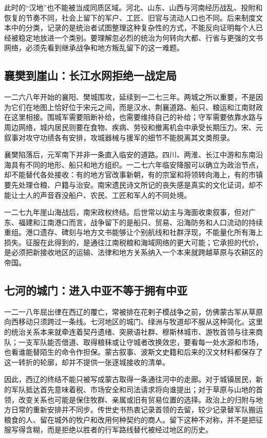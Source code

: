 此时的“汉地”也不能被当成同质区域。河北、山东、山西与河南经历战乱、投附和恢复的节奏不同，社会上留下的军户、工匠、旧官与流动人口也不同。后来制度文本中的分类，记录的是统治者试图整理这种复杂性的方式，不能反向证明每个人已经被稳定地放进一个类别。要理解忽必烈的统治为何转向大都、行省与更强的文书网络，必须先看到继承战争和地方叛乱留下的这一难题。

\subsection{襄樊到崖山：长江水网拒绝一战定局}

一二六八年开始的襄阳、樊城围攻，延续到一二七三年。两城之所以重要，不是因为它们在地图上恰好位于宋元之间，而是汉水、荆襄道路、船只、粮运和江南财政在这里相接。围城军需要阻断补给，也需要维持自己的补给；守军需要依靠水路与周边网络，城内居民则要在食物、疾病、劳役和撤离机会中承受长期压力。宋、元叙事对攻守功绩各有安排，攻城器械与援军的细节不能脱离其文类照录。

襄樊陷落后，元军南下并非一条直入临安的道路。四川、两淮、长江中游和东南沿海具有不同的地形、船只和地方组织。一二七六年临安降服可以确立为政治节点，却不能替代各处接收：有的地方官改事新朝，有的宗室和将领转向海上，有的市镇要先处理仓粮、户籍与治安。南宋遗民诗文所记的丧失感是真实的文化证词，却不能让士人的声音吞没船户、农民、工匠和军人的不同处境。

一二七九年崖山海战后，南宋政权终结。后世常以幼主与海面收束叙事，但对广东、福建和江南港口而言，战争留下的是船只、贸易、沿海防务和人口流动的持续重组。港口遗存、碑刻与地方文书能够让个别航线和社群浮现，不能量化所有海上损失。征服在此得到的，是通往江南税粮和海域网络的更大可能；它承担的代价，是必须把新接收地区的运输、法律和地方关系纳入一个本来就跨越草原与农耕区的帝国。

\subsection{七河的城门：进入中亚不等于拥有中亚}

一二一八年屈出律在西辽的覆亡，常被排在花剌子模战争之前，仿佛蒙古军从草原向西移动只须跨过一条线。七河地区的城门、绿洲与牧道却不服从这种简化。这里的统治关系本来就牵连着契丹遗绪、突厥语社群、穆斯林城市、游牧首领与往来商队；一支军队能否借道、取得粮秣或让守城者改换效忠，要看每一处水源和市场，也看谁能替陌生的命令作担保。蒙古叙事、波斯文史籍和后来的汉文材料都保存了这一转折的轮廓，却并不提供一张逐城接收的清单。

因此，西辽的终结不能只被写成蒙古取得一条通往河中的走廊。对于城镇居民，新的军队抵达首先意味着税、市场安全和司法请求将向谁提出；对于草原与山地的首领，改变关系也可能是保住牧群、亲属或旧有贸易位置的选择。政治上的归附与地方日常的重新安排并不同步。传世史书热衷记录首领的去留，较少记录替军队搬运粮食的人、留在城外的牧户和改用何种契约的商人。留下这种不对称，并不是把征服写得含糊，而是拒绝以胜者的行军路线替代被经过地区的历史。

